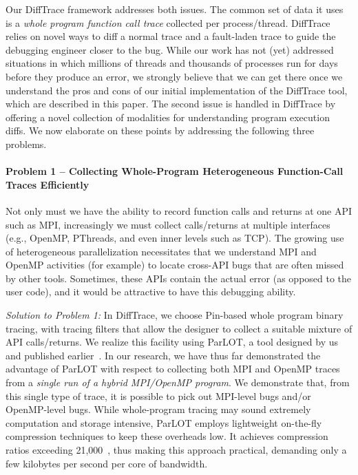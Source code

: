 Our DiffTrace framework addresses both issues.
%
The common set of data it uses is a {\em whole program
function call trace} collected per process/thread.
%
DiffTrace relies on
novel ways to diff a normal trace and a fault-laden trace to guide the
debugging engineer closer to the bug.
%
While our work has not (yet) addressed situations in
which millions of threads and thousands of processes run
for days before they produce an error,
we strongly believe that we can get there
once we understand the pros and cons of our initial
implementation of the DiffTrace tool, which are described in this paper.
%
The second issue is handled in DiffTrace by offering a novel
collection of modalities for understanding program execution diffs.
%
We now elaborate on these points by addressing the following three problems.



\paragraph{Problem 1 -- Collecting Whole-Program Heterogeneous Function-Call Traces
Efficiently\/} Not only must we have the ability
to record function calls and returns at one
API such as MPI, increasingly we must collect calls/returns at multiple
interfaces (e.g., OpenMP, PThreads, and even inner levels such as TCP).
%
The growing use of heterogeneous parallelization necessitates that we 
understand MPI and OpenMP activities (for example) to locate cross-API
bugs that are often missed by other tools.
%
Sometimes, these APIs contain the actual error (as opposed to the user code), and it would be attractive to have this debugging ability.


{\em Solution to Problem 1:\/}
In DiffTrace, we choose Pin-based whole program binary tracing, with
tracing filters that allow the designer to collect a suitable mixture of API
calls/returns.
%
We realize this facility using
ParLOT, a tool designed by us and published earlier~\cite{parlot}.
%
In our research, we have thus far demonstrated the advantage of
ParLOT with respect to collecting both MPI and OpenMP traces
from a {\em single run of a hybrid MPI/OpenMP program}.
%
We demonstrate that, from this single type of trace, it is possible
to pick out MPI-level bugs and/or OpenMP-level bugs.
%
While whole-program tracing
may sound extremely computation and storage intensive, ParLOT employs
lightweight on-the-fly compression techniques to keep these overheads low.
%
It achieves compression ratios exceeding 21,000~\cite{parlot},
thus making this approach practical, demanding
only a few kilobytes per second per core of bandwidth.


